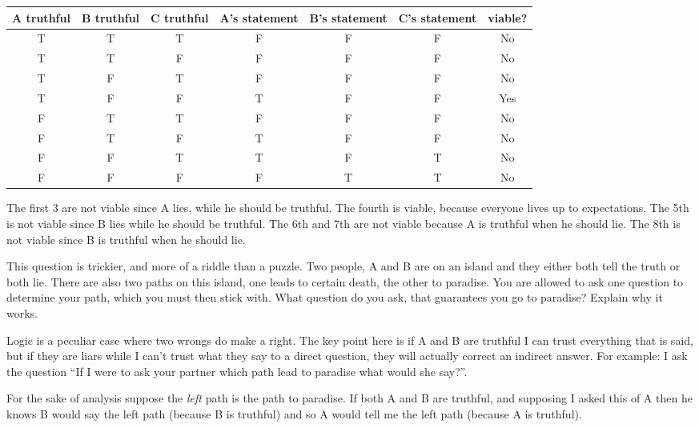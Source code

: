\documentclass[addpoints]{exam}
\begin{document}
\begin{questions}
\begin{solution}
  {\small
    \begin{tabular}[h]{c@{\,}|c@{\,}|c@{\,}|c@{\,}|c@{\,}|c@{\,}|c@{\,}}
      A truthful & B truthful & C truthful & A's statement & B's statement & C's
      statement & viable?\\
      \hline
      T & T & T & F & F & F & No\\
      T & T & F & F & F & F & No\\
      T & F & T & F & F & F & No\\
      T & F & F & T & F & F & Yes\\
      F & T & T & F & F & F & No\\
      F & T & F & T & F & F & No\\
      F & F & T & T & F & T & No\\
      F & F & F & F & T & T & No\\
    \end{tabular}
  }
  
  The first 3 are not viable since A lies, while he should be truthful. The
  fourth is viable, because everyone lives up to expectations. The 5th is not
  viable since B lies while he should be truthful. The 6th and 7th are not
  viable because A is truthful when he should lie. The 8th is not viable since B
  is truthful when he should lie.
  \end{solution}

  \bonusquestion[5] This question is trickier, and more of a riddle than a
  puzzle. Two people, A and B are on an island and they either both tell the
  truth or both lie. There are also two paths on this island, one leads to
  certain death, the other to paradise. You are allowed to ask one question to
  determine your path, which you must then stick with. What question do you ask,
  that guarantees you go to paradise? Explain why it works.
  \begin{solution}
    Logic is a peculiar case where two wrongs do make a right. The key point
    here is if A and B are truthful I can trust everything that is said, but if
    they are liars while I can't 
    trust what they say to a direct question, they will actually correct an
    indirect answer. For example: I ask the question ``If I were to ask your
    partner which path lead to paradise what would she say?''.

    For the sake of analysis suppose the \emph{left} path is the path to
    paradise. If both A and B are truthful, and supposing I asked this of A then
    he knows B would say the left path (because B is truthful) and so A would
    tell me the left path (because A is truthful). 


\end{solution}
\end{questions}
\end{document}

